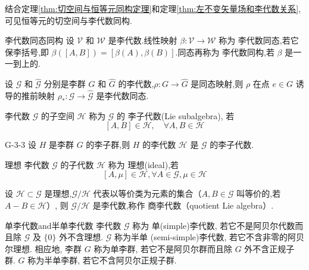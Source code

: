 \documentclass[../main.tex]{subfiles}
\begin{document}
     结合定理\ref{thm:切空间与恒等元同构定理}和定理\ref{thm:左不变矢量场和李代数关系},可见恒等元的切空间与李代数同构.
 \begin{definition}{}{李代数同态同构}
     设 $\mathscr{V}$ 和 $\mathscr{W}$ 是李代数.线性映射 $\beta : \mathscr{V}\rightarrow\mathscr{W}$ 称为 李代数同态,若它保李括号,即 $\beta([A,B]) = [\beta(A),\beta(B)]$.同态再称为 李代数同构,若 $\beta$ 是一一到上的.
 \end{definition}
 \begin{theorem}
     设 $\mathscr{G}$ 和 $\hat{\mathscr{G}}$ 分别是李群 $G$ 和 $\hat{G}$ 的李代数,$\rho:G\rightarrow\hat{G}$ 是同态映射,则 $\rho$ 在点 $e\in G$ 诱导的推前映射 $\rho_*:\mathscr{G}\rightarrow\hat{\mathscr{G}}$ 是李代数同态.
 \end{theorem}
 \begin{definition}
     李代数 $\mathscr{G}$ 的子空间 $\mathscr{H}$ 称为 $\mathscr{G}$ 的  李子代数(Lie subalgebra), 若
     $$ [A, B]\in\mathscr{H},\quad \forall A, B \in \mathscr{H} $$
 \end{definition}
 \begin{theorem}{}{G-3-3}
     设 $H$ 是李群 $G$ 的李子群,则 $H$ 的李代数 $\mathscr{H}$ 是 $\mathscr{G}$ 的李子代数.
 \end{theorem}
\begin{definition}{}{理想}
	李代数 $\mathscr{G}$ 的子代数 $\mathscr{H}$ 称为 理想(ideal),若
	$$ [A,\mu] \in \mathscr{H},\forall  A\in\mathscr{G},\mu \in \mathscr{H} $$
\end{definition}
\begin{theorem}{}
	设 $\mathscr{H}\subset\mathscr{G}$ 是理想,$\mathscr{G}/\mathscr{H}$ 代表以等价类为元素的集合（$A,B\in \mathscr{G}$ 叫等价的,若 $A-B\in\mathscr{H}$）, 则 $\mathscr{G}/\mathscr{H}$ 是李代数,称作 商李代数（quotient Lie algebra）.
\end{theorem}
\begin{definition}{}{单李代数and半单李代数}
	李代数 $  \mathscr{G}  $ 称为 单(simple)李代数, 若它不是阿贝尔代数而且除 $\mathscr{G}  $ 及 $  \{0\}$ 外不含理想. $ \mathscr{G}$ 称为半单 (semi-simple)李代数, 若它不含非零的阿贝尔理想. 相应地, 李群 $  G  $ 称为单李群, 若它不是阿贝尔群而且除 $  G  $ 外不含正规子群. $ G  $ 称为半单李群, 若它不含阿贝尔正规子群.
\end{definition}
\end{document}
